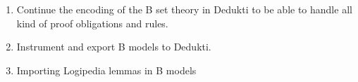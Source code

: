 \begin{enumerate}

  \item Continue the encoding of the B set theory in Dedukti to be
  able to handle all kind of proof obligations and rules.

\item Instrument and export B models to Dedukti.

  \item Importing Logipedia lemmas in B models

\end{enumerate}
